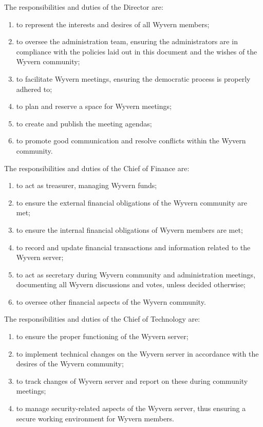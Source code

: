 \begin{enumerate}
    \begin{item}
        The responsibilities and duties of the Director are:
        \begin{enumerate}
            \item to represent the interests and desires of all Wyvern members;
            \item to oversee the administration team, ensuring the administrators are in compliance with the policies laid out in this document and the wishes of the Wyvern community;
            \item to facilitate Wyvern meetings, ensuring the democratic process is properly adhered to;
            \item to plan and reserve a space for Wyvern meetings;
            \item to create and publish the meeting agendas;
            \item to promote good communication and resolve conflicts within the Wyvern community.
        \end{enumerate}
    \end{item}

    \begin{item}
        The responsibilities and duties of the Chief of Finance are:
        \begin{enumerate}
            \item to act as treasurer, managing Wyvern funds;
            \item to ensure the external financial obligations of the Wyvern community are met;
            \item to ensure the internal financial obligations of Wyvern members are met;
            \item to record and update financial transactions and information related to the Wyvern server;
            \item to act as secretary during Wyvern community and administration meetings, documenting all Wyvern discussions and votes, unless decided otherwise;
            \item to oversee other financial aspects of the Wyvern community.
        \end{enumerate}
    \end{item}

    \begin{item}
        The responsibilities and duties of the Chief of Technology are:
        \begin{enumerate}
            \item to ensure the proper functioning of the Wyvern server;
            \item to implement technical changes on the Wyvern server in accordance with the desires of the Wyvern community;
            \item to track changes of Wyvern server and report on these during community meetings;
            \item to manage security-related aspects of the Wyvern server, thus ensuring a secure working environment for Wyvern members.
        \end{enumerate}
    \end{item}


\end{enumerate}
